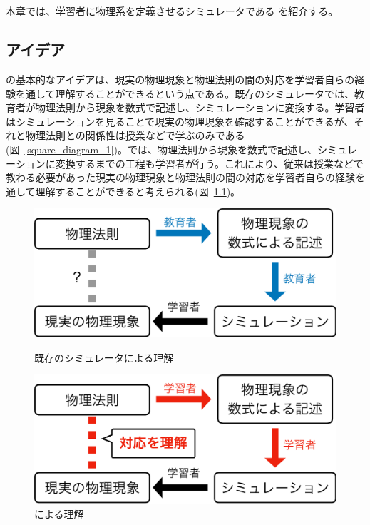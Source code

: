 \chapter{\simname} \label{idea}

本章では、学習者に物理系を定義させるシミュレータである \simname を紹介する。

\section{アイデア}
\simname の基本的なアイデアは、現実の物理現象と物理法則の間の対応を学習者自らの経験を通して理解することができるという点である。既存のシミュレータでは、教育者が物理法則から現象を数式で記述し、シミュレーションに変換する。学習者はシミュレーションを見ることで現実の物理現象を確認することができるが、それと物理法則との関係性は授業などで学ぶのみである(図~\ref{square_diagram_1})。\simname では、物理法則から現象を数式で記述し、シミュレーションに変換するまでの工程も学習者が行う。これにより、従来は授業などで教わる必要があった現実の物理現象と物理法則の間の対応を学習者自らの経験を通して理解することができると考えられる(図~\ref{square_diagram_2})。

\begin{figure}[htb]
  \centering
  \begin{minipage}{0.4\linewidth}
  \includegraphics*[width=\linewidth]{work/square_diagram_1-crop.pdf}
  \caption{既存のシミュレータによる理解} \label{square_diagram_1}
  \end{minipage}
  \quad
  \begin{minipage}{0.4\linewidth}
  \includegraphics*[width=\linewidth]{work/square_diagram_2-crop.pdf}
  \caption{\simname による理解} \label{square_diagram_2}
  \end{minipage}
  \end{figure}

